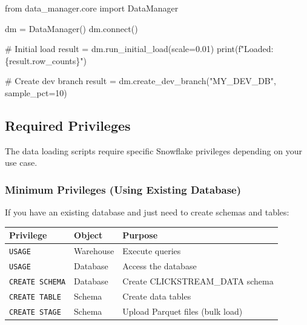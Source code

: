 \documentclass[
  letterpaper,
  DIV=11,
  numbers=noendperiod]{scrreprt}
\newenvironment{Shaded}{\begin{snugshade}}{\end{snugshade}}
\newcommand{\BuiltInTok}[1]{\textcolor[rgb]{0.00,0.23,0.31}{#1}}
\newcommand{\CommentTok}[1]{\textcolor[rgb]{0.37,0.37,0.37}{#1}}
\newcommand{\DecValTok}[1]{\textcolor[rgb]{0.68,0.00,0.00}{#1}}
\newcommand{\ExtensionTok}[1]{\textcolor[rgb]{0.00,0.23,0.31}{#1}}
\newcommand{\FloatTok}[1]{\textcolor[rgb]{0.68,0.00,0.00}{#1}}
\newcommand{\ImportTok}[1]{\textcolor[rgb]{0.00,0.46,0.62}{#1}}
\newcommand{\NormalTok}[1]{\textcolor[rgb]{0.00,0.23,0.31}{#1}}
\newcommand{\OperatorTok}[1]{\textcolor[rgb]{0.37,0.37,0.37}{#1}}
\newcommand{\SpecialCharTok}[1]{\textcolor[rgb]{0.37,0.37,0.37}{#1}}
\newcommand{\SpecialStringTok}[1]{\textcolor[rgb]{0.13,0.47,0.30}{#1}}
\newcommand{\StringTok}[1]{\textcolor[rgb]{0.13,0.47,0.30}{#1}}
\begin{document}
\begin{Shaded}
\begin{Highlighting}[]
\ImportTok{from}\NormalTok{ data\_manager.core }\ImportTok{import}\NormalTok{ DataManager}

\NormalTok{dm }\OperatorTok{=}\NormalTok{ DataManager()}
\NormalTok{dm.}\ExtensionTok{connect}\NormalTok{()}

\CommentTok{\# Initial load}
\NormalTok{result }\OperatorTok{=}\NormalTok{ dm.run\_initial\_load(scale}\OperatorTok{=}\FloatTok{0.01}\NormalTok{)}
\BuiltInTok{print}\NormalTok{(}\SpecialStringTok{f"Loaded: }\SpecialCharTok{\{}\NormalTok{result}\SpecialCharTok{.}\NormalTok{row\_counts}\SpecialCharTok{\}}\SpecialStringTok{"}\NormalTok{)}

\CommentTok{\# Create dev branch}
\NormalTok{result }\OperatorTok{=}\NormalTok{ dm.create\_dev\_branch(}\StringTok{"MY\_DEV\_DB"}\NormalTok{, sample\_pct}\OperatorTok{=}\DecValTok{10}\NormalTok{)}
\end{Highlighting}
\end{Shaded}

\hypertarget{required-privileges-1}{%
\subsection{Required Privileges}\label{required-privileges-1}}

The data loading scripts require specific Snowflake privileges depending
on your use case.

\hypertarget{minimum-privileges-using-existing-database}{%
\subsubsection{Minimum Privileges (Using Existing
Database)}\label{minimum-privileges-using-existing-database}}

If you have an existing database and just need to create schemas and
tables:

\begin{longtable}[]{@{}lll@{}}
\toprule\noalign{}
Privilege & Object & Purpose \\
\midrule\noalign{}
\endhead
\bottomrule\noalign{}
\endlastfoot
\texttt{USAGE} & Warehouse & Execute queries \\
\texttt{USAGE} & Database & Access the database \\
\texttt{CREATE\ SCHEMA} & Database & Create CLICKSTREAM\_DATA schema \\
\texttt{CREATE\ TABLE} & Schema & Create data tables \\
\texttt{CREATE\ STAGE} & Schema & Upload Parquet files (bulk load) \\
\end{longtable}
\end{document}
